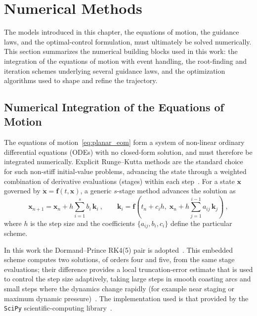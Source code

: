 
\section{Numerical Methods}
\label{sec:numerical_methods}

The models introduced in this chapter, the equations of motion, the guidance laws, and the optimal-control formulation, must ultimately be solved numerically. This section summarizes the numerical building blocks used in this work: the integration of the equations of motion with event handling, the root-finding and iteration schemes underlying several guidance laws, and the optimization algorithms used to shape and refine the trajectory.


\subsection{Numerical Integration of the Equations of Motion}
\label{ssec:integration}

The equations of motion~\eqref{eq:planar_eom} form a system of non-linear ordinary differential equations (ODEs) with no closed-form solution, and must therefore be integrated numerically. Explicit Runge--Kutta methods are the standard choice for such non-stiff initial-value problems, advancing the state through a weighted combination of derivative evaluations (stages) within each step~\cite{burden2015numerical}. For a state $\mathbf{x}$ governed by $\dot{\mathbf{x}}=\mathbf{f}(t,\mathbf{x})$, a generic $s$-stage method advances the solution as
\begin{equation}
\mathbf{x}_{n+1} = \mathbf{x}_n + h\sum_{i=1}^{s} b_i\,\mathbf{k}_i \ ,
\qquad
\mathbf{k}_i = \mathbf{f}\!\left(t_n+c_i h,\; \mathbf{x}_n + h\sum_{j=1}^{i-1} a_{ij}\,\mathbf{k}_j\right) \ ,
\label{eq:rk_generic}
\end{equation}
where $h$ is the step size and the coefficients $\{a_{ij},b_i,c_i\}$ define the particular scheme.

In this work the Dormand--Prince RK4(5) pair is adopted~\cite{dormand1980family}. This embedded scheme computes two solutions, of orders four and five, from the same stage evaluations; their difference provides a local truncation-error estimate that is used to control the step size adaptively, taking large steps in smooth coasting arcs and small steps where the dynamics change rapidly (for example near staging or maximum dynamic pressure)~\cite{burden2015numerical}. The implementation used is that provided by the \texttt{SciPy} scientific-computing library~\cite{virtanen2020scipy}.

